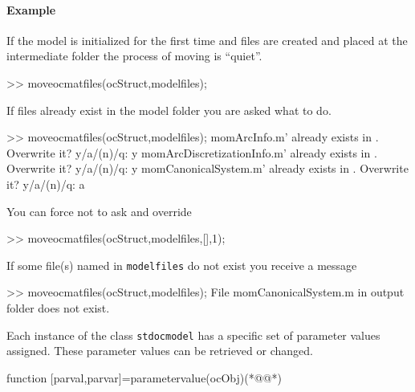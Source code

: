 \paragraph{Example}
If the model is initialized for the first time and files are created and placed at the intermediate folder the process of moving is ``quiet''.
\begin{matlab}
>> moveocmatfiles(ocStruct,modelfiles);
\end{matlab}
If files already exist in the model folder you are asked what to do.
\begin{matlab}
>> moveocmatfiles(ocStruct,modelfiles);
momArcInfo.m' already exists in \ocmat\model\usermodel\mom. Overwrite it?  y/a/(n)/q: y
momArcDiscretizationInfo.m' already exists in \ocmat\model\usermodel\mom. Overwrite it?  y/a/(n)/q: y
momCanonicalSystem.m' already exists in \ocmat\model\usermodel\mom. Overwrite it?  y/a/(n)/q: a
\end{matlab}
You can force not to ask and override
\begin{matlab}
>> moveocmatfiles(ocStruct,modelfiles,[],1);
\end{matlab}
If some file(s) named in \lstinline+modelfiles+ do not exist you receive a message
\begin{matlab}
>> moveocmatfiles(ocStruct,modelfiles);
File momCanonicalSystem.m in output folder \ocmat\model\usermodel\out does not exist.
\end{matlab}
Each instance of the class \lstinline+stdocmodel+ has a specific set of parameter values assigned. These parameter values can be retrieved or changed.
\begin{matlab}
function [parval,parvar]=parametervalue(ocObj)(*@@*)
%
%
\end{matlab}
